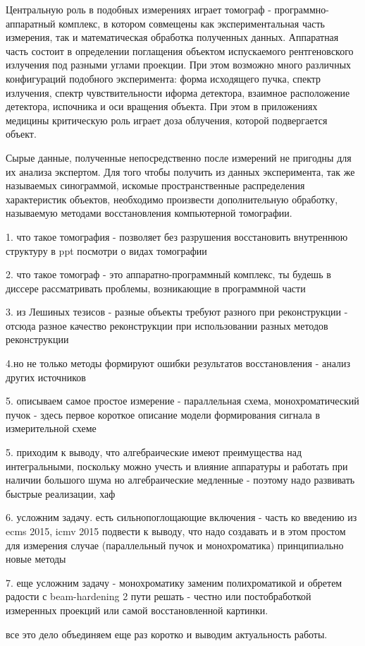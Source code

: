 Центральную роль в подобных измерениях играет томограф - программно-аппаратный комплекс, в котором совмещены как экспериментальная часть измерения, так и математическая обработка полученных данных. Аппаратная часть состоит в определении поглащения объектом испускаемого рентгеновского излучения под разными углами проекции. При этом возможно много различных конфигураций подобного эксперимента: форма исходящего пучка, спектр излучения, спектр чувствительности иформа детектора, взаимное расположение детектора, испочника и оси вращения объекта. При этом в приложениях медицины критическую роль играет доза облучения, которой подвергается объект.

Сырые данные, полученные непосредственно после измерений не пригодны для их анализа экспертом. Для того чтобы получить из данных эксперимента, так же называемых синограммой, искомые пространственные распределения характеристик объектов, необходимо произвести дополнительную обработку, называемую методами восстановления компьютерной томографии. 



1. что такое томография - позволяет без разрушения восстановить внутреннюю структуру в ppt посмотри о видах томографии	

2. что такое томограф - это аппаратно-программный комплекс, ты будешь в диссере рассматривать проблемы, возникающие в программной части

\aim


3. из Лешиных тезисов - разные объекты требуют разного при реконструкции - отсюда разное качество реконструкции при использовании разных методов реконструкции

4.но не только методы формируют ошибки результатов восстановления - анализ других источников

5. описываем самое простое измерение - параллельная схема, монохроматический пучок - здесь первое короткое описание модели формирования сигнала в измерительной схеме

5. приходим к выводу, что алгебраические имеют преимущества над интегральными, поскольку можно учесть и влияние аппаратуры и работать при наличии большого шума
но алгебраические медленные - поэтому надо развивать быстрые реализации, хаф

6. усложним задачу. есть сильнопоглощающие включения - часть ко введению из ecms 2015, icmv 2015 подвести к выводу, что надо создавать и в этом простом для измерения случае (параллельный пучок и монохроматика) принципиально новые методы

7. еще усложним задачу - монохроматику заменим полихроматикой и обретем радости с beam-hardening 2 пути решать - честно или постобработкой измеренных проекций или самой восстановленной картинки.

все это дело объединяем еще раз коротко и выводим актуальность работы.

